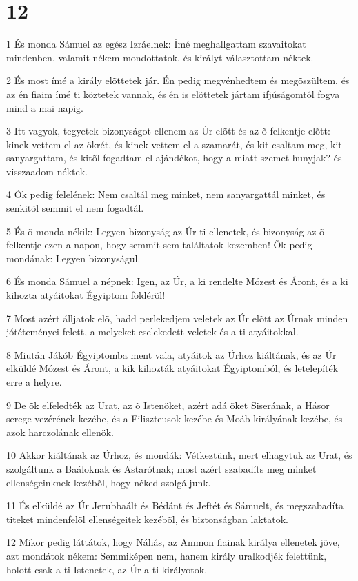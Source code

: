 \chapter{12}

\par 1 És monda Sámuel az egész Izráelnek: Ímé meghallgattam szavaitokat mindenben, valamit nékem mondottatok, és királyt választottam néktek.
\par 2 És most ímé a király elõttetek jár. Én pedig megvénhedtem és megõszültem, és az én fiaim ímé ti köztetek vannak, és én is elõttetek jártam ifjúságomtól fogva mind a mai napig.
\par 3 Itt vagyok, tegyetek bizonyságot ellenem az Úr elõtt és az õ felkentje elõtt: kinek vettem el az ökrét, és kinek vettem el a szamarát, és kit csaltam meg, kit sanyargattam, és kitõl fogadtam el ajándékot, hogy a miatt szemet hunyjak? és visszaadom néktek.
\par 4 Õk pedig felelének: Nem csaltál meg minket, nem sanyargattál minket, és senkitõl semmit el nem fogadtál.
\par 5 És õ monda nékik: Legyen bizonyság az Úr ti ellenetek, és bizonyság az õ felkentje ezen a napon, hogy semmit sem találtatok kezemben! Õk pedig mondának: Legyen bizonyságul.
\par 6 És monda Sámuel a népnek: Igen, az Úr, a ki rendelte Mózest és Áront, és a ki kihozta atyáitokat Égyiptom földérõl!
\par 7 Most azért álljatok elõ, hadd perlekedjem veletek az Úr elõtt az Úrnak minden jótéteményei felett, a melyeket cselekedett veletek és a ti atyáitokkal.
\par 8 Miután Jákób Égyiptomba ment vala, atyáitok az Úrhoz kiáltának, és az Úr elküldé Mózest és Áront, a kik kihozták atyáitokat Égyiptomból, és letelepíték erre a helyre.
\par 9 De õk elfeledték az Urat, az õ Istenöket, azért adá õket Siserának, a Hásor serege vezérének kezébe, és a Filiszteusok kezébe és Moáb  királyának kezébe, és azok harczolának ellenök.
\par 10 Akkor kiáltának az Úrhoz, és mondák: Vétkeztünk, mert elhagytuk az Urat, és szolgáltunk a Baáloknak és Astarótnak; most azért szabadíts meg minket ellenségeinknek kezébõl, hogy néked szolgáljunk.
\par 11 És elküldé az Úr Jerubbaált és Bédánt és Jeftét és Sámuelt, és megszabadíta titeket mindenfelõl ellenségeitek kezébõl, és biztonságban laktatok.
\par 12 Mikor pedig láttátok, hogy Náhás, az Ammon fiainak királya ellenetek jöve, azt mondátok nékem: Semmiképen nem, hanem király uralkodjék felettünk, holott csak a ti Istenetek, az Úr a ti királyotok.
